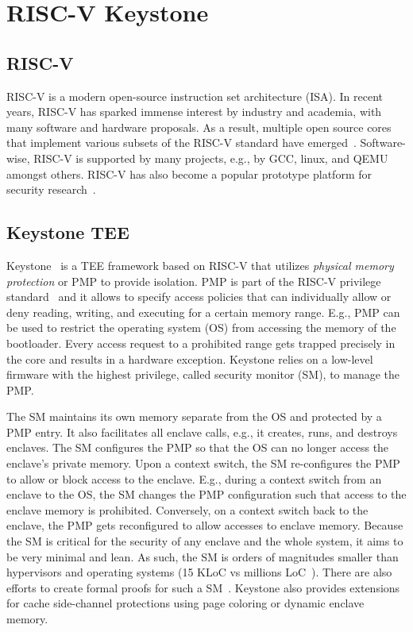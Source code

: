 \section{RISC-V Keystone}

\subsection{RISC-V}
RISC-V is a modern open-source instruction set architecture (ISA). In recent years, RISC-V has sparked immense interest by industry and academia, with many software and hardware proposals. As a result, multiple open source cores that implement various subsets of the RISC-V standard have emerged~\cite{ariane,asanovic2016rocket,riscy,asanovic2015boom}. Software-wise, RISC-V is supported by many projects, e.g., by GCC, linux, and QEMU amongst others. RISC-V has also become a popular prototype platform for security research~\cite{weiser2019timber,costan2016sanctum,keystone}.


\subsection{Keystone TEE}

Keystone~\cite{keystone} is a TEE framework based on RISC-V that utilizes \emph{physical memory protection} or PMP to provide isolation. PMP is part of the RISC-V privilege standard~\cite{riscv2019privspec} and it allows to specify access policies that can individually allow or deny reading, writing, and executing for a certain memory range. E.g., PMP can be used to restrict the operating system (OS) from accessing the memory of the bootloader. Every access request to a prohibited range gets trapped precisely in the core and results in a hardware exception. Keystone relies on a low-level firmware with the highest privilege, called security monitor (SM), to manage the PMP. 

The SM maintains its own memory separate from the OS and protected by a PMP entry. It also facilitates all enclave calls, e.g., it creates, runs, and destroys enclaves. The SM configures the PMP so that the OS can no longer access the enclave's private memory. Upon a context switch, the SM re-configures the PMP to allow or block access to the enclave. E.g., during a context switch from an enclave to the OS, the SM changes the PMP configuration such that access to the enclave memory is prohibited. Conversely, on a context switch back to the enclave, the PMP gets reconfigured to allow accesses to enclave memory. 
Because the SM is critical for the security of any enclave and the whole system, it aims to be very minimal and lean. As such, the SM is orders of magnitudes smaller than hypervisors and operating systems (15 KLoC vs millions LoC~\cite{torvalds2020linux,barham2003xen}). There are also efforts to create formal proofs for such a SM~\cite{lebedev2019sanctorum}. Keystone also provides extensions for cache side-channel protections using page coloring or dynamic enclave memory. 



